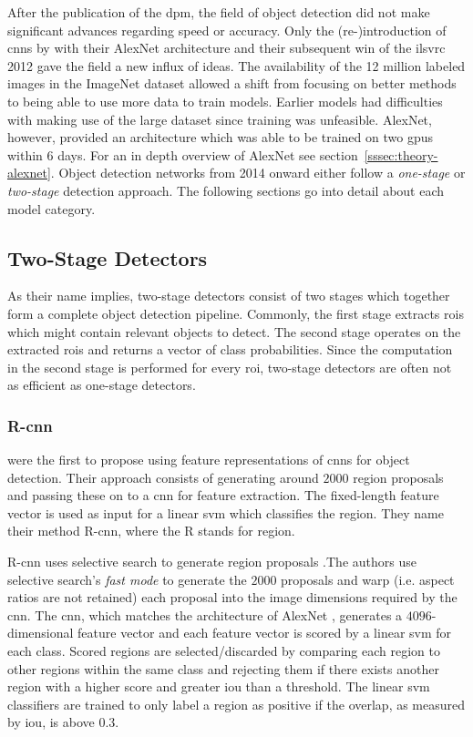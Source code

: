 \documentclass[draft,final]{vutinfth} %
\begin{document}
After the publication of the \gls{dpm}, the field of object detection
did not make significant advances regarding speed or accuracy. Only
the (re-)introduction of \glspl{cnn} by \textcite{krizhevsky2012} with
their AlexNet architecture and their subsequent win of the
\gls{ilsvrc} 2012 gave the field a new influx of ideas. The
availability of the 12 million labeled images in the ImageNet dataset
\cite{deng2009} allowed a shift from focusing on better methods to
being able to use more data to train models. Earlier models had
difficulties with making use of the large dataset since training was
unfeasible. AlexNet, however, provided an architecture which was able
to be trained on two \glspl{gpu} within 6 days. For an in depth
overview of AlexNet see section~\ref{sssec:theory-alexnet}. Object
detection networks from 2014 onward either follow a \emph{one-stage}
or \emph{two-stage} detection approach. The following sections go into
detail about each model category.

\subsection{Two-Stage Detectors}
\label{ssec:theory-two-stage}

As their name implies, two-stage detectors consist of two stages which
together form a complete object detection pipeline. Commonly, the
first stage extracts \glspl{roi} which might contain relevant objects
to detect. The second stage operates on the extracted \glspl{roi} and
returns a vector of class probabilities. Since the computation in the
second stage is performed for every \gls{roi}, two-stage detectors are
often not as efficient as one-stage detectors.

\subsubsection{R-\gls{cnn}}
\label{sssec:theory-rcnn}

\textcite{girshick2014} were the first to propose using feature
representations of \glspl{cnn} for object detection. Their approach
consists of generating around $2000$ region proposals and passing
these on to a \gls{cnn} for feature extraction. The fixed-length
feature vector is used as input for a linear \gls{svm} which
classifies the region. They name their method R-\gls{cnn}, where the R
stands for region.

R-\gls{cnn} uses selective search to generate region proposals
\cite{uijlings2013}.The authors use selective search's \emph{fast
mode} to generate the $2000$ proposals and warp (i.e. aspect ratios
are not retained) each proposal into the image dimensions required by
the \gls{cnn}. The \gls{cnn}, which matches the architecture of
AlexNet \cite{krizhevsky2012}, generates a $4096$-dimensional feature
vector and each feature vector is scored by a linear \gls{svm} for
each class. Scored regions are selected/discarded by comparing each
region to other regions within the same class and rejecting them if
there exists another region with a higher score and greater \gls{iou}
than a threshold. The linear \gls{svm} classifiers are trained to only
label a region as positive if the overlap, as measured by \gls{iou},
is above $0.3$.
\end{document}
